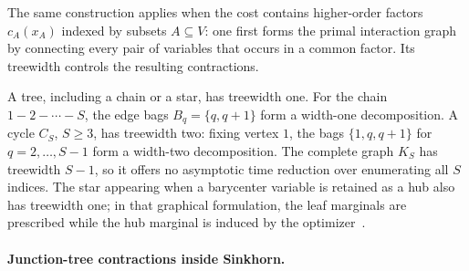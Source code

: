 The same construction applies when the cost contains higher-order factors $c_A(x_A)$ indexed by subsets $A\subseteq V$: one first forms the primal interaction graph by connecting every pair of variables that occurs in a common factor. Its treewidth controls the resulting contractions.

\begin{example}\label{ex-treewidth-graphs}
	A tree, including a chain or a star, has treewidth one. For the chain $1-2-\cdots-S$, the edge bags $B_q=\{q,q+1\}$ form a width-one decomposition. A cycle $C_S$, $S\geq3$, has treewidth two: fixing vertex $1$, the bags $\{1,q,q+1\}$ for $q=2,\ldots,S-1$ form a width-two decomposition. The complete graph $K_S$ has treewidth $S-1$, so it offers no asymptotic time reduction over enumerating all $S$ indices. The star appearing when a barycenter variable is retained as a hub also has treewidth one; in that graphical formulation, the leaf marginals are prescribed while the hub marginal is induced by the optimizer~\cite{FanHaaslerKarlssonChen2021GraphCostMOT}.
\end{example}

\paragraph{Junction-tree contractions inside Sinkhorn.}

